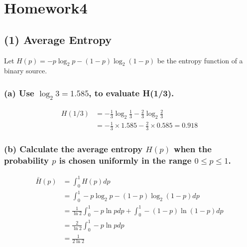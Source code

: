 \hypertarget{homework4}{%
\section{Homework4}\label{homework4}}

\hypertarget{average-entropy}{%
\subsection{(1) Average Entropy}\label{average-entropy}}

Let \(H(p) = −p\log_2{p}-(1-p)\log_2{(1-p)}\) be the entropy function of
a binary source.

\hypertarget{a-use-log_2-3-1.585-to-evaluate-h13.}{%
\subsubsection{\texorpdfstring{(a) Use \(\log_2 3 = 1.585\), to evaluate
H(1/3).}{(a) Use \textbackslash log\_2 3 = 1.585, to evaluate H(1/3).}}\label{a-use-log_2-3-1.585-to-evaluate-h13.}}

\[
\begin{aligned}
H(1/3)
&=−\frac{1}{3}\log_2\frac{1}{3}−\frac{2}{3}\log_2\frac{2}{3}\\
&=-\frac{1}{3}\times1.585-\frac{2}{3}\times0.585=0.918
\end{aligned}
\]

\hypertarget{b-calculate-the-average-entropy-hp-when-the-probability-p-is-chosen-uniformly-in-the-range-0-p-1.}{%
\subsubsection{\texorpdfstring{(b) Calculate the average entropy
\(H(p)\) when the probability \(p\) is chosen uniformly in the range
\(0 ≤ p ≤ 1\).}{(b) Calculate the average entropy H(p) when the probability p is chosen uniformly in the range 0 ≤ p ≤ 1.}}\label{b-calculate-the-average-entropy-hp-when-the-probability-p-is-chosen-uniformly-in-the-range-0-p-1.}}

\[
\begin{aligned}
\bar{H}(p)
&=\int_0^1H(p)dp\\
&=\int_0^1−p\log_2{p}-(1-p)\log_2{(1-p)}dp\\
&=\frac1{\ln2}\int_0^1−p\ln{p}dp+\int_0^1-(1-p)\ln{(1-p)}dp\\
&=\frac2{\ln2}\int_0^1−p\ln{p}dp\\
&=\frac1{2\ln2}
\end{aligned}
\]

